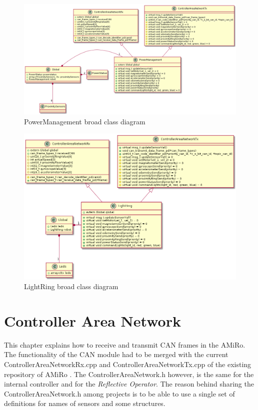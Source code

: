 \documentclass[12pt]{report}%
\begin{document}
\begin{figure}[ht]
	\centering
	\includegraphics[width=\textwidth]{PMclass}
    \caption{PowerManagement broad class diagram}
    \label{fig:PMclass}
\end{figure}

\begin{figure}[ht]
	\centering
	\includegraphics[width=\textwidth]{LRclass}
    \caption{LightRing broad class diagram}
    \label{fig:LRclass}
\end{figure}

\chapter{Controller Area Network}
\label{chap:CAN}
This chapter explains how to receive and transmit CAN frames in the AMiRo. The functionality of the CAN module had to be merged with the current ControllerAreaNetworkRx.cpp and ControllerAreaNetworkTx.cpp of the existing repository of AMiRo \cite{AMiRo_Wiki}. The ControllerAreaNetwork.h however, is the same for the internal controller and for the \textit{Reflective Operator}. The reason behind sharing the ControllerAreaNetwork.h among projects is to be able to use a single set of definitions for names of sensors and some structures.
\end{document}
